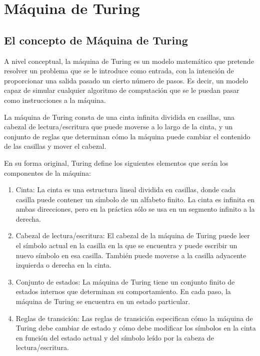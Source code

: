 \chapter{Máquina de Turing}

\section{El concepto de Máquina de Turing}

A nivel conceptual, la máquina de Turing es un modelo matemático que pretende resolver un problema que se le introduce como entrada, con la intención de proporcionar una salida pasado un cierto número de pasos.
Es decir, un modelo capaz de simular cualquier algoritmo de computación que se le puedan pasar como instrucciones a la máquina.

La máquina de Turing consta de una cinta infinita dividida en casillas, una cabezal de lectura/escritura que puede moverse a lo largo de la cinta, y un conjunto de reglas que determinan cómo la máquina puede 
cambiar el contenido de las casillas y mover el cabezal.

En su forma original, Turing define los siguientes elementos que serán los componentes de la máquina:

\begin{enumerate}
    \item Cinta: La cinta es una estructura lineal dividida en casillas, donde cada casilla puede contener un símbolo de un alfabeto finito. La cinta es infinita en ambas direcciones, pero en la 
            práctica sólo se usa en un segmento infinito a la derecha.
    \item Cabezal de lectura/escritura: El cabezal de la máquina de Turing puede leer el símbolo actual en la casilla en la que se encuentra y puede escribir un nuevo símbolo en esa casilla. También 
            puede moverse a la casilla adyacente izquierda o derecha en la cinta.
    \item Conjunto de estados: La máquina de Turing tiene un conjunto finito de estados internos que determinan su comportamiento. En cada paso, la máquina de Turing se encuentra en un estado particular.
    \item Reglas de transición: Las reglas de transición especifican cómo la máquina de Turing debe cambiar de estado y cómo debe modificar los símbolos en la cinta en función del estado actual y del símbolo 
            leído por la cabeza de lectura/escritura.
\end{enumerate}

